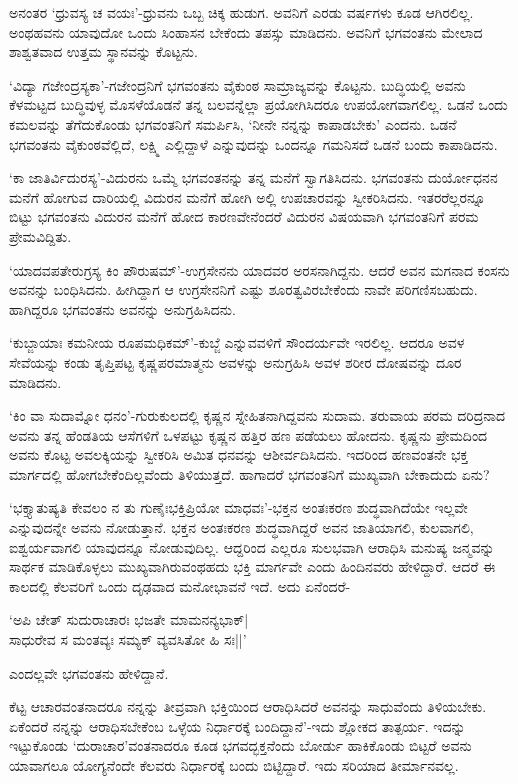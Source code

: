 ಅನಂತರ `ಧ್ರುವಸ್ಯ ಚ ವಯಃ'-ಧ್ರುವನು ಒಬ್ಬ ಚಿಕ್ಕ ಹುಡುಗ. ಅವನಿಗೆ ಎರಡು ವರ್ಷಗಳು ಕೂಡ ಆಗಿರಲಿಲ್ಲ. ಅಂಥಹವನು ಯಾವುದೋ ಒಂದು ಸಿಂಹಾಸನ ಬೇಕೆಂದು ತಪಸ್ಸು ಮಾಡಿದನು. ಅವನಿಗೆ ಭಗವಂತನು ಮೇಲಾದ ಶಾಶ್ವತವಾದ ಉತ್ತಮ ಸ್ಥಾನವನ್ನು ಕೊಟ್ಟನು.

`ವಿದ್ಯಾ ಗಜೇಂದ್ರಸ್ಯಕಾ'-ಗಜೇಂದ್ರನಿಗೆ ಭಗವಂತನು ವೈಕುಂಠ ಸಾಮ್ರಾಜ್ಯವನ್ನು ಕೊಟ್ಟನು. ಬುದ್ಧಿಯಲ್ಲಿ ಅವನು ಕೆಳಮಟ್ಟದ ಬುದ್ಧಿವುಳ್ಳ ಮೊಸಳೆಯೊಡನೆ ತನ್ನ ಬಲವನ್ನೆಲ್ಲಾ ಪ್ರಯೋಗಿಸಿದರೂ ಉಪಯೋಗವಾಗಲಿಲ್ಲ. ಒಡನೆ ಒಂದು ಕಮಲವನ್ನು ತೆಗೆದುಕೊಂಡು ಭಗವಂತನಿಗೆ ಸಮರ್ಪಿಸಿ, `ನೀನೇ ನನ್ನನ್ನು ಕಾಪಾಡಬೇಕು' ಎಂದನು. ಒಡನೆ ಭಗವಂತನು ವೈಕುಂಠವೆಲ್ಲಿದೆ, ಲಕ್ಷ್ಮಿ ಎಲ್ಲಿದ್ದಾಳೆ ಎನ್ನುವುದನ್ನು ಒಂದನ್ನೂ ಗಮನಿಸದೆ ಒಡನೆ ಬಂದು ಕಾಪಾಡಿದನು.

`ಕಾ ಜಾತಿರ್ವಿದುರಸ್ಯ'-ವಿದುರನು ಒಮ್ಮೆ ಭಗವಂತನನ್ನು ತನ್ನ ಮನೆಗೆ ಸ್ವಾಗತಿಸಿದನು. ಭಗವಂತನು ದುರ್ಯೋಧನನ ಮನೆಗೆ ಹೋಗುವ ದಾರಿಯಲ್ಲಿ ವಿದುರನ ಮನೆಗೆ ಹೋಗಿ ಅಲ್ಲಿ ಉಪಚಾರವನ್ನು ಸ್ವೀಕರಿಸಿದನು. ಇತರರೆಲ್ಲರನ್ನೂ ಬಿಟ್ಟು ಭಗವಂತನು ವಿದುರನ ಮನೆಗೆ ಹೋದ ಕಾರಣವೇನೆಂದರೆ ವಿದುರನ ವಿಷಯವಾಗಿ ಭಗವಂತನಿಗೆ ಪರಮ ಪ್ರೇಮವಿದ್ದಿತು.

`ಯಾದವಪತೇರುಗ್ರಸ್ಯ ಕಿಂ ಪೌರುಷಮ್'-ಉಗ್ರಸೇನನು ಯಾದವರ ಅರಸನಾಗಿದ್ದನು. ಆದರೆ ಅವನ ಮಗನಾದ ಕಂಸನು ಅವನನ್ನು ಬಂಧಿಸಿದನು. ಹೀಗಿದ್ದಾಗ ಆ ಉಗ್ರಸೇನನಿಗೆ ಎಷ್ಟು ಶೂರತ್ವವಿರಬೇಕೆಂದು ನಾವೇ ಪರಿಗಣಿಸಬಹುದು. ಹಾಗಿದ್ದರೂ ಭಗವಂತನು ಅವನನ್ನು ಅನುಗ್ರಹಿಸಿದನು.

`ಕುಬ್ಜಾಯಾಃ ಕಮನೀಯ ರೂಪಮಧಿಕಮ್'-ಕುಬ್ಜೆ ಎನ್ನುವವಳಿಗೆ ಸೌಂದರ್ಯವೇ ಇರಲಿಲ್ಲ. ಆದರೂ ಅವಳ ಸೇವೆಯನ್ನು ಕಂಡು ತೃಪ್ತಿಪಟ್ಟ ಕೃಷ್ಣಪರಮಾತ್ಮನು ಅವಳನ್ನು ಅನುಗ್ರಹಿಸಿ ಅವಳ ಶರೀರ ದೋಷವನ್ನು ದೂರ ಮಾಡಿದನು.

`ಕಿಂ ವಾ ಸುದಾಮ್ನೋ ಧನಂ'-ಗುರುಕುಲದಲ್ಲಿ ಕೃಷ್ಣನ ಸ್ನೇಹಿತನಾಗಿದ್ದವನು ಸುದಾಮ. ತರುವಾಯ ಪರಮ ದರಿದ್ರನಾದ ಅವನು ತನ್ನ ಹೆಂಡತಿಯ ಆಸೆಗಳಿಗೆ ಒಳಪಟ್ಟು ಕೃಷ್ಣನ ಹತ್ತಿರ ಹಣ ಪಡೆಯಲು ಹೋದನು. ಕೃಷ್ಣನು ಪ್ರೇಮದಿಂದ ಅವನು ಕೊಟ್ಟ ಅವಲಕ್ಕಿಯನ್ನು ಸ್ವೀಕರಿಸಿ ಅಮಿತ ಧನವನ್ನು ಆಶೀರ್ವದಿಸಿದನು. ಇದರಿಂದ ಹಣವಂತನೇ ಭಕ್ತ ಮಾರ್ಗದಲ್ಲಿ ಹೋಗಬೇಕೆಂದಿಲ್ಲವೆಂದು ತಿಳಿಯುತ್ತದೆ. ಹಾಗಾದರೆ ಭಗವಂತನಿಗೆ ಮುಖ್ಯವಾಗಿ ಬೇಕಾದುದು ಏನು?

`ಭಕ್ತ್ಯಾತುಷ್ಯತಿ ಕೇವಲಂ ನ ತು ಗುಣೈಃಭಕ್ತಿಪ್ರಿಯೋ ಮಾಧವಃ'-ಭಕ್ತನ ಅಂತಃಕರಣ ಶುದ್ಧವಾಗಿದೆಯೇ ಇಲ್ಲವೇ ಎನ್ನುವುದನ್ನೇ ಅವನು ನೋಡುತ್ತಾನೆ. ಭಕ್ತನ ಅಂತಃಕರಣ ಶುದ್ಧವಾಗಿದ್ದರೆ ಅವನ ಜಾತಿಯಾಗಲಿ, ಕುಲವಾಗಲಿ, ಐಶ್ವರ್ಯವಾಗಲಿ ಯಾವುದನ್ನೂ ನೋಡುವುದಿಲ್ಲ. ಆದ್ದರಿಂದ ಎಲ್ಲರೂ ಸುಲಭವಾಗಿ ಆರಾಧಿಸಿ ಮನುಷ್ಯ ಜನ್ಮವನ್ನು ಸಾರ್ಥಕ ಮಾಡಿಕೊಳ್ಳಲು ಮುಖ್ಯವಾಗಿರುವಂಥಹದು ಭಕ್ತಿ ಮಾರ್ಗವೇ ಎಂದು ಹಿಂದಿನವರು ಹೇಳಿದ್ದಾರೆ. ಆದರೆ ಈ ಕಾಲದಲ್ಲಿ ಕೆಲವರಿಗೆ ಒಂದು ದೃಢವಾದ ಮನೋಭಾವನೆ ಇದೆ. ಅದು ಏನೆಂದರೆ-

\begin{shloka}
`ಅಪಿ ಚೇತ್ ಸುದುರಾಚಾರಃ ಭಜತೇ ಮಾಮನನ್ಯಭಾಕ್|\\
ಸಾಧುರೇವ ಸ ಮಂತವ್ಯಃ ಸಮ್ಯಕ್ ವ್ಯವಸಿತೋ ಹಿ ಸಃ||'
\end{shloka}

ಎಂದಲ್ಲವೇ ಭಗವಂತನು ಹೇಳಿದ್ದಾನೆ.

ಕೆಟ್ಟ ಆಚಾರವಂತನಾದರೂ ನನ್ನನ್ನು ತೀವ್ರವಾಗಿ ಭಕ್ತಿಯಿಂದ ಆರಾಧಿಸಿದರೆ ಅವನನ್ನು ಸಾಧುವೆಂದು ತಿಳಿಯಬೇಕು. ಏಕೆಂದರೆ ನನ್ನನ್ನು ಆರಾಧಿಸಬೇಕೆಂಬ ಒಳ್ಳೆಯ ನಿರ್ಧಾರಕ್ಕೆ ಬಂದಿದ್ದಾನೆ'-ಇದು ಶ್ಲೋಕದ ತಾತ್ಪರ್ಯ. ಇದನ್ನು ಇಟ್ಟುಕೊಂಡು `ದುರಾಚಾರ'ವಂತನಾದರೂ ಕೂಡ ಭಗವದ್ಭಕ್ತನೆಂದು ಬೋರ್ಡು ಹಾಕಿಕೊಂಡು ಬಿಟ್ಟರೆ ಅವನು ಯಾವಾಗಲೂ ಯೋಗ್ಯನೆಂದೇ ಕೆಲವರು ನಿರ್ಧಾರಕ್ಕೆ ಬಂದು ಬಿಟ್ಟಿದ್ದಾರೆ. ಇದು ಸರಿಯಾದ ತೀರ್ಮಾನವಲ್ಲ.

